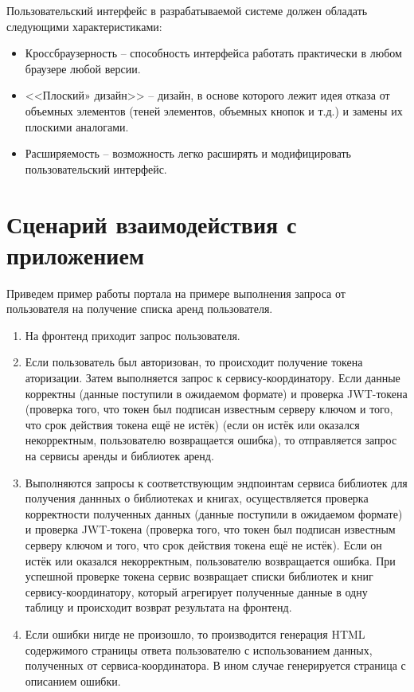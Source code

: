 Пользовательский интерфейс в разрабатываемой системе должен обладать следующими характеристиками:
\begin{itemize}
  \item Кроссбраузерность -- способность интерфейса работать практически в любом браузере любой версии. 
  \item <<Плоский» дизайн>> -- дизайн, в основе которого лежит идея отказа от объемных элементов (теней элементов, объемных кнопок и т.д.) и замены их плоскими аналогами.
  \item Расширяемость -- возможность легко расширять и модифицировать пользовательский интерфейс.
\end{itemize}
  
  
\section{Сценарий взаимодействия с приложением}
Приведем пример работы портала на примере выполнения запроса от пользователя на получение списка аренд пользователя.

\begin{enumerate}
  \item На фронтенд приходит запрос пользователя.
  \item Если пользователь был авторизован, то происходит получение токена аторизации. Затем выполняется запрос к сервису-координатору. Если данные корректны (данные поступили в ожидаемом формате) и проверка JWT-токена (проверка того, что токен был подписан известным серверу ключом и того, что срок действия токена ещё не истёк) (если он истёк или оказался некорректным, пользователю возвращается ошибка), то отправляется запрос на сервисы аренды и библиотек аренд. 
  \item Выполняются запросы к соответствующим эндпоинтам сервиса библиотек для получения даннных о библиотеках и книгах, осуществляется проверка корректности полученных данных (данные поступили в ожидаемом формате) и проверка JWT-токена (проверка того, что токен был подписан известным серверу ключом и того, что срок действия токена ещё не истёк). Если он истёк или оказался некорректным, пользователю возвращается ошибка. При успешной проверке токена сервис возвращает списки библиотек и книг сервису-координатору, который агрегирует полученные данные в одну таблицу и происходит возврат результата на фронтенд.
  \item Если ошибки нигде не произошло, то производится генерация HTML содержимого страницы ответа пользователю с использованием данных, полученных от сервиса-координатора. В ином случае генерируется страница с описанием ошибки.
\end{enumerate}
